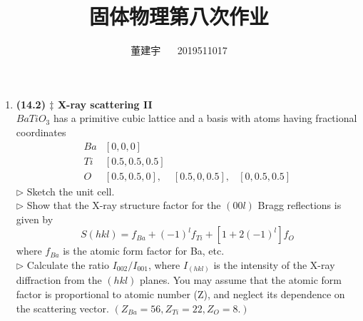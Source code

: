 \documentclass[reqno,a4paper,12pt]{amsart}
\title{固体物理第八次作业}
\author{董建宇 ~~ 2019511017}
\begin{document}
\maketitle
\titleformat{\section}[hang]{\small}{\thesection}{0.8em}{}{}
\titleformat{\subsection}[hang]{\small}{\thesubsection}{0.8em}{}{}

\begin{enumerate}[1.]
\item \textbf{(14.2) $\ddagger$ X-ray scattering II} \\
$BaTiO_3$ has a primitive cubic lattice and a basis with atoms having fractional coordinates 
\[
\begin{array}{llll}
	Ba & [0,0,0] &  &  \\
	Ti & [0.5,0.5,0.5] &  &  \\
	O & [0.5,0.5,0], & [0.5,0,0.5], & [0,0.5,0.5]
\end{array}
\]
$\triangleright$ Sketch the unit cell. \\
$\triangleright$ Show that the X-ray structure factor for the $(00l)$ Bragg reflections is given by 
\[
	S(hkl) = f_{Ba} + (-1)^l f_{Ti} + \left[ 1+2(-1)^l \right]f_O
\]
where $f_{Ba}$ is the atomic form factor for Ba, etc. \\
$\triangleright$ Calculate the ratio $I_{002}/I_{001}$, where $I_{(hkl)}$ is the intensity of the X-ray diffraction from the $(hkl)$ planes. You may assume that the atomic form factor is proportional to atomic number (Z), and neglect its dependence on the scattering vector. $(Z_{Ba} = 56, Z_{Ti} = 22, Z_O = 8.)$


\end{enumerate}
\end{document}
